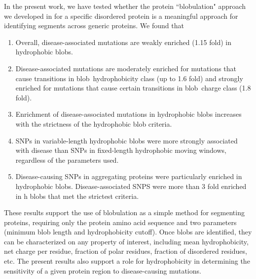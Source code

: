 \documentclass[10pt,letterpaper]{article}
\newcommand{\hydrochar}{hydrophobicity class}
\newcommand{\chargechar}{charge class}
\begin{document}
In the present work, we have tested whether the protein ``blobulation" approach we developed in \cite{Lohia2019} for a specific disordered protein is a meaningful approach for identifying segments across generic proteins.  We found that 
\begin{enumerate} 
\item Overall, disease-associated mutations are weakly enriched (1.15 fold) in hydrophobic blobs. 
\item Disease-associated mutations are moderately enriched for mutations that cause transitions in blob~\hydrochar{} (up to 1.6 fold) and strongly enriched for mutations that cause certain transitions in blob~\chargechar{} (1.8 fold).
\item Enrichment of disease-associated mutations in hydrophobic blobs increases with the strictness of the hydrophobic blob criteria.  
\item SNPs in variable-length hydrophobic blobs were more strongly associated with disease than SNPs in fixed-length hydrophobic moving windows, regardless of the parameters used. 
\item Disease-causing SNPs in aggregating proteins were particularly enriched in hydrophobic blobs. Disease-associated SNPS were more than 3 fold enriched in h blobs that met the strictest criteria. 
\end{enumerate}
These results support the use of blobulation as a simple method for segmenting proteins, requiring only the protein amino acid sequence and two parameters (minimum blob length and hydrophobicity cutoff). Once blobs are identified, they can be characterized on any property of interest, including  mean hydrophobicity, net charge per residue, fraction of polar residues, fraction of disordered residues, etc. The present results also support a role for hydrophobicity in determining the sensitivity of a given protein region to disease-causing mutations. 

\end{document}
